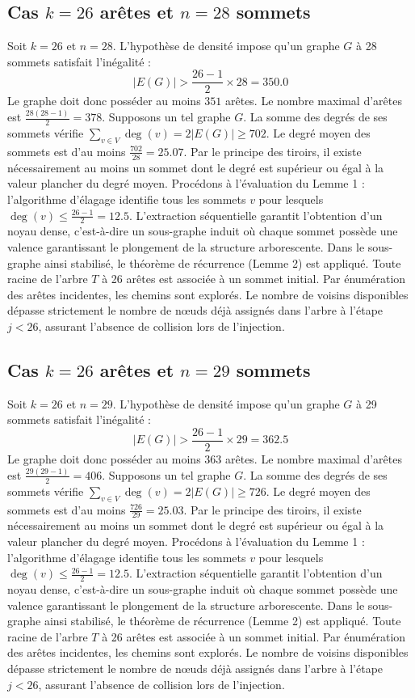 \documentclass[12pt,a4paper]{article}
\begin{document}
\subsection{Cas $k = 26$ arêtes et $n = 28$ sommets}
Soit $k = 26$ et $n = 28$. L'hypothèse de densité impose qu'un graphe $G$ à 28 sommets satisfait l'inégalité :
$$ |E(G)| > \frac{26-1}{2} \times 28 = 350.0 $$
Le graphe doit donc posséder au moins $351$ arêtes. Le nombre maximal d'arêtes est $\frac{28(28-1)}{2} = 378$.
Supposons un tel graphe $G$. La somme des degrés de ses sommets vérifie $\sum_{v \in V} \deg(v) = 2|E(G)| \geq 702$.
Le degré moyen des sommets est d'au moins $\frac{702}{28} = 25.07$.
Par le principe des tiroirs, il existe nécessairement au moins un sommet dont le degré est supérieur ou égal à la valeur plancher du degré moyen.
Procédons à l'évaluation du Lemme 1 : l'algorithme d'élagage identifie tous les sommets $v$ pour lesquels $\deg(v) \leq \frac{26-1}{2} = 12.5$.
L'extraction séquentielle garantit l'obtention d'un noyau dense, c'est-à-dire un sous-graphe induit où chaque sommet possède une valence garantissant le plongement de la structure arborescente.
Dans le sous-graphe ainsi stabilisé, le théorème de récurrence (Lemme 2) est appliqué. Toute racine de l'arbre $T$ à 26 arêtes est associée à un sommet initial. Par énumération des arêtes incidentes, les chemins sont explorés. Le nombre de voisins disponibles dépasse strictement le nombre de nœuds déjà assignés dans l'arbre à l'étape $j < 26$, assurant l'absence de collision lors de l'injection.

\subsection{Cas $k = 26$ arêtes et $n = 29$ sommets}
Soit $k = 26$ et $n = 29$. L'hypothèse de densité impose qu'un graphe $G$ à 29 sommets satisfait l'inégalité :
$$ |E(G)| > \frac{26-1}{2} \times 29 = 362.5 $$
Le graphe doit donc posséder au moins $363$ arêtes. Le nombre maximal d'arêtes est $\frac{29(29-1)}{2} = 406$.
Supposons un tel graphe $G$. La somme des degrés de ses sommets vérifie $\sum_{v \in V} \deg(v) = 2|E(G)| \geq 726$.
Le degré moyen des sommets est d'au moins $\frac{726}{29} = 25.03$.
Par le principe des tiroirs, il existe nécessairement au moins un sommet dont le degré est supérieur ou égal à la valeur plancher du degré moyen.
Procédons à l'évaluation du Lemme 1 : l'algorithme d'élagage identifie tous les sommets $v$ pour lesquels $\deg(v) \leq \frac{26-1}{2} = 12.5$.
L'extraction séquentielle garantit l'obtention d'un noyau dense, c'est-à-dire un sous-graphe induit où chaque sommet possède une valence garantissant le plongement de la structure arborescente.
Dans le sous-graphe ainsi stabilisé, le théorème de récurrence (Lemme 2) est appliqué. Toute racine de l'arbre $T$ à 26 arêtes est associée à un sommet initial. Par énumération des arêtes incidentes, les chemins sont explorés. Le nombre de voisins disponibles dépasse strictement le nombre de nœuds déjà assignés dans l'arbre à l'étape $j < 26$, assurant l'absence de collision lors de l'injection.
\end{document}
